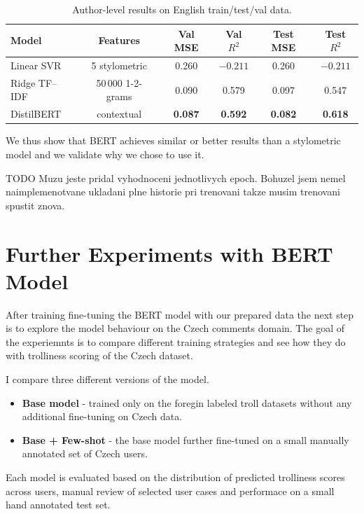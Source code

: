 \documentclass[twoside]{ctuthesis}
\theoremstyle{plain}
\theoremstyle{definition}
\theoremstyle{note}
\begin{document}
\begin{table}[ht]
	\centering
	\caption{Author-level results on English train/test/val data.}
	\label{tab:en_author_results}
	\begin{tabular}{lccccc}
	  \hline
	  \textbf{Model} & \textbf{Features} &
	  \textbf{Val MSE} & \textbf{Val $R^{2}$} &
	  \textbf{Test MSE} & \textbf{Test $R^{2}$} \\
	  \hline
	  Linear SVR & 5 stylometric          & 0.260 & $-0.211$ & 0.260 & $-0.211$ \\
	  Ridge TF--IDF & 50\,000 1-2-grams   & 0.090 & 0.579   & 0.097 & 0.547    \\
	  DistilBERT & contextual   & \textbf{0.087} & \textbf{0.592} &
										   \textbf{0.082} & \textbf{0.618} \\
	  \hline
	\end{tabular}
\end{table}



We thus show that BERT achieves similar or better results than a stylometric model and we validate why we chose to use it.

TODO Muzu jeste pridal vyhodnoceni jednotlivych epoch. Bohuzel jsem nemel naimplemenotvane ukladani plne historie pri trenovani takze musim trenovani spustit znova.

\section{Further Experiments with BERT Model}

After training fine-tuning the BERT model with our prepared data the next step is to explore the model behaviour on the Czech comments domain. The goal of the experiemnts is to compare different training strategies and see how they do with trolliness scoring of the Czech dataset.\par
I compare three different versions of the model. 
\begin{itemize} 
	\item \textbf{Base model} - trained only on the foregin labeled troll datasets without any additional fine-tuning on Czech data. 
	\item \textbf{Base + Few-shot} - the base model further fine-tuned on a small manually annotated set of Czech users. 
\end{itemize}
Each model is evaluated based on the distribution of predicted trolliness scores across users, manual review of selected user cases and performace on a small hand annotated test set.
\end{document}
